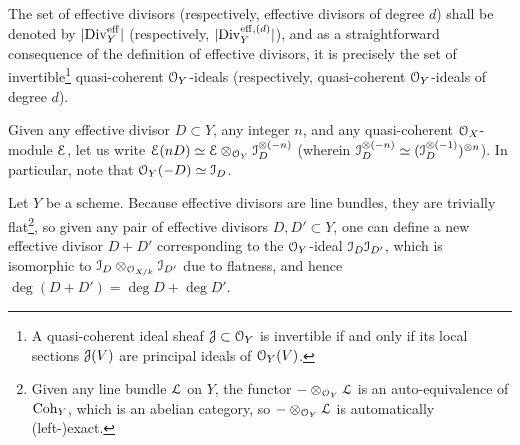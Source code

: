         \begin{convention}
            The set of effective divisors (respectively, effective divisors of degree $d$) shall be denoted by $|\mathrm{Div}_Y^{\mathrm{eff}}|$ (respectively, $|\mathrm{Div}_Y^{\mathrm{eff}, (d)}|$), and as a straightforward consequence of the definition of effective divisors, it is precisely the set of invertible\footnote{A quasi-coherent ideal sheaf $\mathcal{J} \subset \mathcal{O}_Y$ is invertible if and only if its local sections $\mathcal{J}(V)$ are principal ideals of $\mathcal{O}_Y(V)$.} quasi-coherent $\mathcal{O}_Y$-ideals (respectively, quasi-coherent $\mathcal{O}_Y$-ideals of degree $d$).
        \end{convention}
        \begin{convention}
            Given any effective divisor $D \subset Y$, any integer $n$, and any quasi-coherent $\mathcal{O}_X$-module $\mathcal{E}$, let us write $\E(nD) \cong \E \tensor_{\calO_Y} \calI_D^{\tensor (-n)}$ (wherein $\calI_D^{\tensor (-n)} \cong (\calI_D^{\tensor (-1)})^{\tensor n}$). In particular, note that $\mathcal{O}_Y(-D) \simeq \mathcal{I}_D$.
        \end{convention}
        \begin{remark} \label{remark: adding_effective_divisors}
            Let $Y$ be a scheme. Because effective divisors are line bundles, they are trivially flat\footnote{Given any line bundle $\mathcal{L}$ on $Y$, the functor $- \tensor_{\calO_Y} \calL$ is an auto-equivalence of $\mathrm{Coh}_Y$, which is an abelian category, so $- \tensor_{\calO_Y} \calL$ is automatically (left-)exact.}, so given any pair of effective divisors $D, D' \subset Y$, one can define a new effective divisor $D + D'$ corresponding to the $\mathcal{O}_Y$-ideal $\mathcal{I}_D \mathcal{I}_{D'}$, which is isomorphic to $\calI_D \tensor_{\calO_{X/k}} \calI_{D'}$ due to flatness, and hence $\deg(D + D') = \deg D + \deg D'$.
        \end{remark}
        
